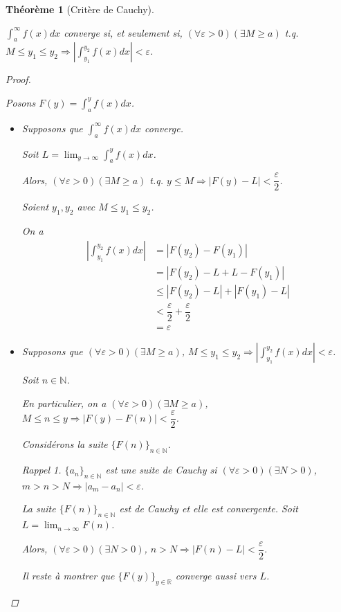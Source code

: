 \documentclass{report}
\newcommand*{\dlim}[3]{\displaystyle\lim_{#1 \to #2}#3}
\newcommand*{\dint}[3]{\displaystyle\int_{#1}^{#2}#3}
\newcommand*{\abs}[1]{\left| #1 \right|}
\newcommand*{\eps}{\varepsilon}
\newcommand*{\lte}{\leqslant}
\newcommand*{\gte}{\geqslant}
\newcommand*{\reels}{\mathbb{R}}
\newcommand*{\naturels}{\mathbb{N}}
\newtheorem*{thm}{Th\'eor\`eme}
\theoremstyle{definition}
\theoremstyle{remark}
\newtheorem*{rapp}{Rappel}
\begin{document}
	\begin{thm}[Crit\`ere de Cauchy]~

		$\dint{a}{\infty}{f(x)dx}$ converge si, et seulement si, $(\forall\eps>0) (\exists M \gte a)$ t.q. $M \lte y_1 \lte y_2 \Rightarrow \abs{\dint{y_1}{y_2}{f(x)dx}}<\eps$.
		\begin{proof}~

			Posons $F(y) = \dint{a}{y}{f(x)dx}$.
			\begin{itemize}
				\item[$(\Rightarrow)$] Supposons que $\dint{a}{\infty}{f(x)dx}$ converge.

				Soit $L = \dlim{y}{\infty}{\dint{a}{y}{f(x)dx}}$.

				Alors, $(\forall\eps>0) (\exists M \gte a)$ t.q. $y \lte M \Rightarrow \abs{F(y)-L}<\dfrac{\eps}{2}$.

				Soient $y_1,y_2$ avec $M \lte y_1 \lte y_2$.

				On a
				\begin{align*}
					\abs{\dint{y_1}{y_2}{f(x)dx}}&= \abs{F(y_2)-F(y_1)}\\
					&= \abs{F(y_2)-L+L-F(y_1)}\\
					&\lte \abs{F(y_2)-L} + \abs{F(y_1)-L}\\
					&< \dfrac{\eps}{2} + \dfrac{\eps}{2}\\
					&= \eps
				\end{align*}
				\item[$(\Leftarrow)$] Supposons que $(\forall\eps>0)(\exists M \gte a)$, $M \lte y_1 \lte y_2 \Rightarrow \abs{\dint{y_1}{y_2}{f(x)dx}} < \eps$.

				Soit $n \in \naturels$.

				En particulier, on a $(\forall\eps>0) (\exists M \gte a)$, $M \lte n \lte y \Rightarrow \abs{F(y)-F(n)}<\dfrac{\eps}{2}$.

				Consid\'erons la suite $\{F(n)\}_{n \in \naturels}$.
				\begin{rapp}
					$\{a_n\}_{n \in \naturels}$ est une \emph{suite de Cauchy} si $(\forall\eps>0) (\exists N>0)$, $m>n>N \Rightarrow \abs{a_m-a_n}<\eps$.
				\end{rapp}

				La suite $\{F(n)\}_{n \in \naturels}$ est de Cauchy et elle est convergente. Soit $L = \dlim{n}{\infty}{F(n)}$.

				Alors, $(\forall\eps>0) (\exists N>0)$, $n>N \Rightarrow \abs{F(n)-L}<\dfrac{\eps}{2}$.

				Il reste \`a montrer que $\{F(y)\}_{y \in \reels}$ converge aussi vers $L$.


\end{itemize}
\end{proof}
\end{thm}
\end{document}
